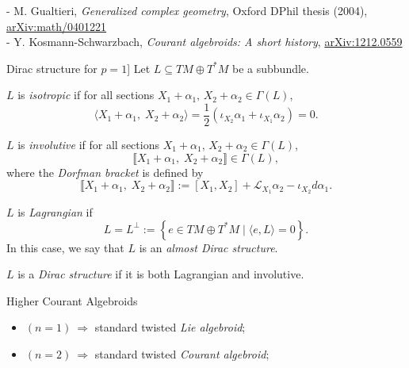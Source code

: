 \documentclass[beamer,10pt,handout]{standalone}  \Handouttrue
\begin{document}
{- M. Gualtieri, \textit{Generalized complex geometry}, Oxford DPhil thesis (2004), \hyperref[https://arxiv.org/abs/math/0401221]{arXiv:math/0401221} \\
- Y. Kosmann-Schwarzbach, \textit{Courant algebroids: A short history}, \hyperref[https://arxiv.org/abs/1212.0559]{arXiv:1212.0559}
	\item Dirac structure for \texorpdfstring{$p = 1$}{p = 1}]
Let \( L \subseteq TM \oplus T^*M \) be a subbundle.
  \item \( L \) is \emph{isotropic} if for all sections \( X_1 + \alpha_1,\, X_2 + \alpha_2 \in \Gamma(L) \),
  \[
  \langle X_1 + \alpha_1,\; X_2 + \alpha_2 \rangle = \frac{1}{2}\left( \iota_{X_2} \alpha_1 + \iota_{X_1} \alpha_2 \right) = 0.
  \]

  \item \( L \) is \emph{involutive} if for all sections \( X_1 + \alpha_1,\, X_2 + \alpha_2 \in \Gamma(L) \),
  \[
  \llbracket X_1 + \alpha_1,\; X_2 + \alpha_2 \rrbracket \in \Gamma(L),
  \]
  where the \emph{Dorfman bracket} is defined by
  \[
  \llbracket X_1 + \alpha_1,\; X_2 + \alpha_2 \rrbracket := [X_1, X_2] + \mathcal{L}_{X_1}\alpha_2 - \iota_{X_2} d\alpha_1.
  \]

  \item \( L \) is \emph{Lagrangian} if
  \[
  L = L^\perp := \left\{ e \in TM \oplus T^*M \mid \langle e, L \rangle = 0 \right\}.
  \]
  In this case, we say that \( L \) is an \emph{almost Dirac structure}.

  \item \( L \) is a \emph{Dirac structure} if it is both Lagrangian and involutive.
}



\begin{frame}{Higher Courant Algebroids}
	\begin{defblock}
			
	\end{defblock}

	\begin{itemize}
		\item $(n=1) ~ \Rightarrow$ standard twisted \emph{Lie algebroid};
		\item $(n=2) ~ \Rightarrow$ standard twisted \emph{Courant algebroid};
	\end{itemize}

\end{frame}
\end{document}

